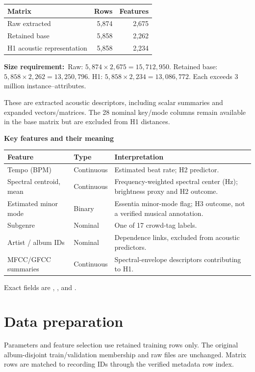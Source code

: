 \documentclass[10pt,a4paper,twocolumn]{article}
\newcommand{\field}[2]{\textbf{#1}~#2\par}
\newcommand{\minihead}[1]{\par\needspace{6\baselineskip}\smallskip\textbf{#1}\par}
\begin{document}
\begin{tabularx}{\linewidth}{@{}Y r r@{}}\toprule
Matrix & Rows & Features\\\midrule
Raw extracted & 5,874 & 2,675\\
Retained base & 5,858 & 2,262\\
H1 acoustic representation & 5,858 & 2,234\\\bottomrule
\end{tabularx}
\field{Size requirement:}{Raw: $5{,}874\times2{,}675=15{,}712{,}950$. Retained base: $5{,}858\times2{,}262=13{,}250{,}796$. H1: $5{,}858\times2{,}234=13{,}086{,}772$. Each exceeds 3 million instance--attributes.}
These are extracted acoustic descriptors, including scalar summaries and expanded vectors/matrices. The 28 nominal key/mode columns remain available in the base matrix but are excluded from H1 distances.

\minihead{Key features and their meaning}
{\small\begin{tabularx}{\linewidth}{@{}L{2.25cm} L{1.65cm} Y@{}}\toprule
Feature & Type & Interpretation\\\midrule
Tempo (BPM) & Continuous & Estimated beat rate; H2 predictor.\\
Spectral centroid, mean & Continuous & Frequency-weighted spectral center (Hz); brightness proxy and H2 outcome.\\
Estimated minor mode & Binary & Essentia minor-mode flag; H3 outcome, not a verified musical annotation.\\
Subgenre & Nominal & One of 17 crowd-tag labels.\\
Artist / album IDs & Nominal & Dependence links, excluded from acoustic predictors.\\
MFCC/GFCC summaries & Continuous & Spectral-envelope descriptors contributing to H1.\\\bottomrule
\end{tabularx}}
Exact fields are , , and .

\section{Data preparation}
Parameters and feature selection use retained training rows only. The original album-disjoint train/validation membership and raw files are unchanged. Matrix rows are matched to recording IDs through the verified metadata row index.
\end{document}
